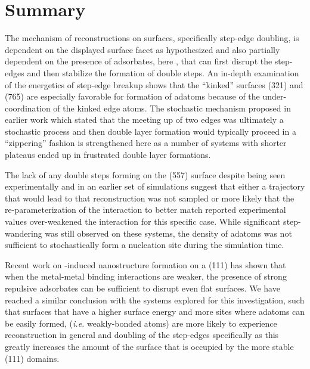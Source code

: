 \section{Summary}
The mechanism of reconstructions on  surfaces, specifically step-edge
doubling, is dependent on the displayed surface facet as hypothesized and also
partially dependent on the presence of adsorbates, here , that can first
disrupt the step-edges and then stabilize the formation of double steps. An in-depth
examination of the energetics of step-edge breakup shows that the ``kinked''
surfaces (321) and (765) are especially favorable for formation of adatoms
because of the under-coordination of the kinked edge atoms. The stochastic
mechanism proposed in earlier work which stated that the meeting up of two
edges was ultimately a stochastic process and then double layer formation would
typically proceed in a ``zippering'' fashion is strengthened here as a number of
systems with shorter plateaus ended up in frustrated double layer formations.

The lack of any double steps forming on the (557) surface despite being seen
experimentally and in an earlier set of simulations suggest that either a
trajectory that would lead to that reconstruction was not sampled or more
likely that the re-parameterization of the  interaction to
better match reported experimental values over-weakened the interaction for
this specific case. While significant step-wandering was still observed on
these systems, the density of adatoms was not sufficient to stochastically form
a nucleation site during the simulation time.

Recent work on -induced nanostructure formation on a  (111) has
shown that when the metal-metal binding interactions are weaker, the presence
of strong repulsive adsorbates can be sufficient to disrupt even flat
surfaces.\citep{Eren:2016qt} We have reached a similar conclusion with the  systems
explored for this investigation, such that surfaces that have a higher surface
energy and more sites where adatoms can be easily formed, ({\em i.e.}
weakly-bonded atoms) are more likely to experience reconstruction in general
and doubling of the step-edges specifically as this greatly increases the
amount of the surface that is occupied by the more stable (111) domains.

